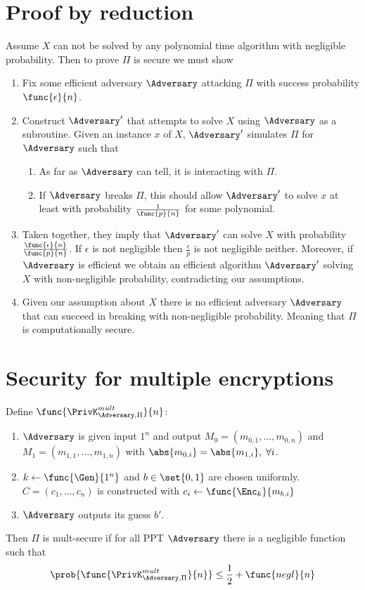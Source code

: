 \section{Proof by reduction}
Assume \(X\) can not be solved by any polynomial time algorithm with negligible probability. Then to prove \(\Pi\) is secure we must show 
\begin{enumerate}
    \item Fix some efficient adversary \(\Adversary\) attacking \(\Pi\) with success probability \(\func{\epsilon}{n}\).
    \item Construct \(\Adversary'\) that attempts to solve \(X\) using \(\Adversary\) as a subroutine. Given an instance \(x\) of \(X\), \(\Adversary'\) simulates \(\Pi\) for \(\Adversary\) such that 
     \begin{enumerate}
        \item As far as \(\Adversary\) can tell, it is interacting with \(\Pi\).
        \item If \(\Adversary\) breaks \(\Pi\), this should allow \(\Adversary'\) to solve \(x\) at least with probability \(\frac{1}{\func{p}{n}}\) for some polynomial.
        
    \end{enumerate}
    \item Taken together, they imply that \(\Adversary'\) can solve \(X\) with probability \(\frac{\func{\epsilon}{n}}{\func{p}{n}}\). If \(\epsilon\) is not negligible then \(\frac{\epsilon}{p}\) is not negligible neither. Moreover, if \(\Adversary\) is efficient we obtain an efficient algorithm \(\Adversary'\) solving \(X\) with non-negligible probability, contradicting our assumptions.
    \item Given our assumption about \(X\) there is no efficient adversary \(\Adversary\) that can succeed in breaking with non-negligible probability. Meaning that \(\Pi\) is computationally secure.
\end{enumerate}

\section{Security for multiple encryptions}
Define \(\func{\PrivK_{\Adversary, \Pi}^{mult}}{n}\):
\begin{enumerate}
    \item \(\Adversary\) is given input \(1^n\) and output \(M_0 = (m_{0,1}, \dots , m_{0,n})\) and \(M_1 = (m_{1,1}, \dots , m_{1,n})\) with \(\abs{m_{0,i}} = \abs{m_{1,i}}, \; \forall i\).
    \item  \(k \gets \func{\Gen}{1^n}\) and \(b \in \set{0,1}\)  are chosen uniformly. \(C = (c_1, \dots, c_n)\) is constructed with \(c_i \gets \func{\Enc_k}{m_{b,i}}\)
    \item \(\Adversary\) outputs its guess \(b'\).
\end{enumerate}
Then \(\Pi\) is mult-secure if for all PPT \(\Adversary\) there is a negligible function such that 
\begin{equation*}
    \prob{\func{\PrivK_{\Adversary, \Pi}^{mult}}{n}} \leq \frac{1}{2} + \func{negl}{n}
\end{equation*}

